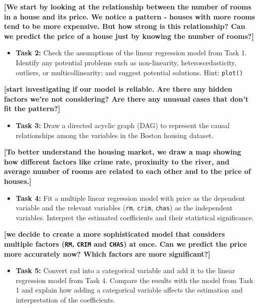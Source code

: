 \documentclass[
]{book}
\providecommand{\tightlist}{%
  \setlength{\itemsep}{0pt}\setlength{\parskip}{0pt}}
\begin{document}
\textbf{{[}We start by looking at the relationship between the number of rooms in a house and its price. We notice a pattern - houses with more rooms tend to be more expensive. But how strong is this relationship? Can we predict the price of a house just by knowing the number of rooms?{]}}

\begin{itemize}
\tightlist
\item
  \textbf{Task 2:} Check the assumptions of the linear regression model from Task 1. Identify any potential problems such as non-linearity, heteroscedasticity, outliers, or multicollinearity; and suggest potential solutions. Hint: \texttt{plot()}
\end{itemize}

\textbf{{[}start investigating if our model is reliable. Are there any hidden factors we're not considering? Are there any unusual cases that don't fit the pattern?{]}}

\begin{itemize}
\tightlist
\item
  \textbf{Task 3:} Draw a directed acyclic graph (DAG) to represent the causal relationships among the variables in the Boston housing dataset.
\end{itemize}

\textbf{{[}To better understand the housing market, we draw a map showing how different factors like crime rate, proximity to the river, and average number of rooms are related to each other and to the price of houses.{]}}

\begin{itemize}
\tightlist
\item
  \textbf{Task 4:} Fit a multiple linear regression model with price as the dependent variable and the relevant variables (\texttt{rm}, \texttt{crim}, \texttt{chas}) as the independent variables. Interpret the estimated coefficients and their statistical significance.
\end{itemize}

\textbf{{[}we decide to create a more sophisticated model that considers multiple factors (\texttt{RM}, \texttt{CRIM} and \texttt{CHAS}) at once. Can we predict the price more accurately now? Which factors are more significant?{]}}

\begin{itemize}
\tightlist
\item
  \textbf{Task 5:} Convert rad into a categorical variable and add it to the linear regression model from Task 4. Compare the results with the model from Task 1 and explain how adding a categorical variable affects the estimation and interpretation of the coefficients.
\end{itemize}
\end{document}
